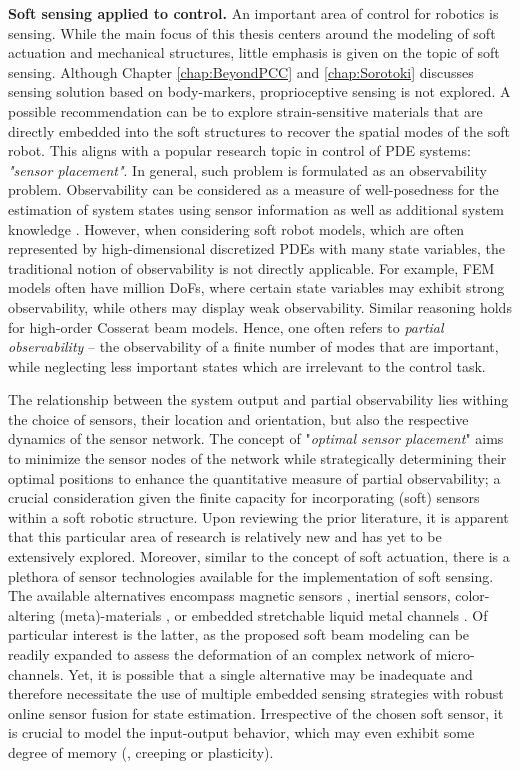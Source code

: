 \textbf{Soft sensing applied to control.} An important area of control for robotics is sensing. While the main focus of this thesis centers around the modeling of soft actuation and mechanical structures, little emphasis is given on the topic of soft sensing. Although Chapter \ref{chap:BeyondPCC} and \ref{chap:Sorotoki} discusses sensing solution based on body-markers, proprioceptive sensing is not explored. A possible recommendation can be to explore strain-sensitive materials that are directly embedded into the soft structures to recover the spatial modes of the soft robot. This aligns with a popular research topic in control of PDE systems: \textit{"sensor placement"}. In general, such problem is formulated as an observability problem. Observability can be considered as a measure of well-posedness for the estimation of system states using sensor information as well as additional system knowledge \cite{Kang2014Jan}. However, when considering soft robot models, which are often represented by high-dimensional discretized PDEs with many state variables, the traditional notion of observability is not directly applicable. For example, FEM models often have million DoFs,
where certain state variables may exhibit strong observability, while others may display weak observability. Similar reasoning holds for high-order Cosserat beam models. Hence, one often refers to \textit{partial observability} \cite{Cohn2006Jul,Kang2014Jan} -- the observability of a finite number of modes that are important, while neglecting less important states which are irrelevant to the control task.

The relationship between the system output and partial observability lies withing the choice of sensors, their location and orientation, but also the respective dynamics of the sensor network. The concept of "\textit{optimal sensor placement}" aims to minimize the sensor nodes of the network while strategically determining their optimal positions to enhance the quantitative measure of partial observability; a crucial consideration given the finite capacity for incorporating (soft) sensors within a soft robotic structure. Upon reviewing the prior literature, it is apparent that this particular area of research is relatively new and has yet to be extensively explored. Moreover, similar to the concept of soft actuation, there is a plethora of sensor technologies available for the implementation of soft sensing. The available alternatives encompass magnetic sensors \cite{Felt2015Oct,Felt2019Feb,Baaij2023}, inertial sensors, color-altering (meta)-materials \cite{Scharff2019Jul}, or embedded stretchable liquid metal channels \cite{Park2012,Tapia2020}. Of particular interest is the latter, as the proposed soft beam modeling can be readily expanded to assess the deformation of an complex network of micro-channels. Yet, it is possible that a single alternative may be inadequate and therefore necessitate the use of multiple embedded sensing strategies with robust online sensor fusion for state estimation. Irrespective of the chosen soft sensor, it is crucial to model the input-output behavior, which may even exhibit some degree of memory (\eg, creeping or plasticity).

